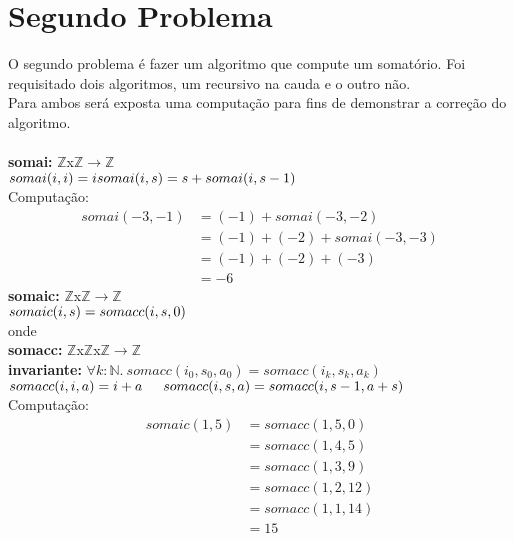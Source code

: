 \documentclass{article}
\begin{document}
\section{Segundo Problema}
O segundo problema é fazer um algoritmo que compute um somatório.
Foi requisitado dois algoritmos, um recursivo na cauda e o outro não.\\
Para ambos será exposta uma computação para fins de demonstrar a correção do algoritmo.\\
\\
\noindent \textbf{somai:} $\mathbb{Z}$x$\mathbb{Z}$$ \rightarrow \mathbb{Z}$\\
$somai(i, i) = i\\
somai(i, s) = s + somai(i, s-1)\\$
\\
Computação:
\begin{align*}
somai(-3, -1) &= (-1) + somai(-3, -2)\\
&= (-1) + (-2) + somai(-3, -3)\\
&= (-1) + (-2) + (-3)\\
&= -6
\end{align*}
\noindent \textbf{somaic:} $\mathbb{Z}$x$\mathbb{Z}$$ \rightarrow \mathbb{Z}$\\
$somaic(i, s) = somacc(i, s, 0)\\$
\\
onde\\
\indent \textbf{somacc:} $\mathbb{Z}$x$\mathbb{Z}$x$\mathbb{Z}$$ \rightarrow \mathbb{Z}$\\
\indent \textbf{invariante:} $\forall k:\mathbb{N}.\: somacc(i_0, s_0, a_0) = somacc(i_k, s_k, a_k)$\\
\indent $somacc(i, i, a) = i + a\\
\indent somacc(i, s, a) = somacc(i, s-1, a+s)\\$
\\
Computação:
\begin{align*}
somaic(1, 5) &= somacc(1, 5, 0)\\
&= somacc(1, 4, 5)\\
&= somacc(1, 3, 9)\\
&= somacc(1, 2, 12)\\
&= somacc(1, 1, 14)\\
&= 15
\end{align*}
\end{document}
